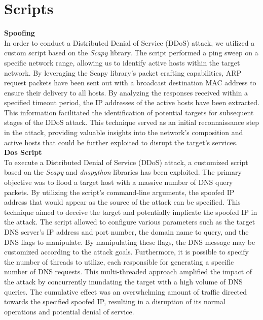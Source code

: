 \section{Scripts}

\textbf{Spoofing}\\
In order to conduct a Distributed Denial of Service (DDoS) attack, we utilized a custom script based on the \textit{Scapy} library. The script performed a ping sweep on a 
specific network range, allowing us to identify active hosts within the target network. By leveraging the Scapy library's packet crafting capabilities,
ARP request packets have been sent out with a broadcast destination MAC address to ensure their delivery to all hosts. By analyzing the responses received 
within a specified timeout period, the IP addresses of the active hosts have been extracted. This information facilitated the identification of potential targets for 
subsequent stages of the DDoS attack. This technique served as an initial reconnaissance step in the attack, providing valuable insights into the 
network's composition and active hosts that could be further exploited to disrupt the target's services.
\\
\textbf{Dos Script}\\
To execute a Distributed Denial of Service (DDoS) attack, a customized script based on the \textit{Scapy} and \textit{dnspython} 
libraries has been exploited. The primary objective 
was to flood a target host with a massive number of DNS query packets. By utilizing the script's command-line arguments, the spoofed 
IP address that would appear as the source of the attack can be specified. This technique aimed to deceive the target and potentially implicate the spoofed IP in 
the attack. The script allowed to configure various parameters such as the target DNS server's IP address and port number, the domain name to 
query, and the DNS flags to manipulate. By manipulating these flags, the DNS message may be customized according to the attack goals. Furthermore, 
it is possible to specify the number of threads to utilize, each responsible for generating a specific number of DNS requests. This multi-threaded approach 
amplified the impact of the attack by concurrently inundating the target with a high volume of DNS queries. The cumulative effect was an overwhelming 
amount of traffic directed towards the specified spoofed IP, resulting in a disruption of its normal operations and potential denial of service.
